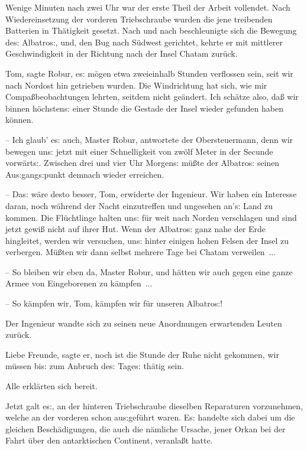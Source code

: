 \documentclass[oneside,12pt]{book}
\newcommand{\s}{s:}
\begin{document}
Wenige Minuten nach zwei Uhr war der erste Theil der Arbeit
vollendet. Nach Wiedereinsetzung der vorderen Triebschraube wurden
die jene treibenden Batterien in Th\"atigkeit gesetzt. Nach und nach
beschleunigte sich die Bewegung de{\s} {\glqq}Albatro{\s}{\grqq},
und, den Bug nach S\"udwest gerichtet, kehrte er mit mittlerer
Geschwindigkeit in der Richtung nach der Insel Chatam zur\"uck.

{\glqq}Tom, sagte Robur, e{\s} m\"ogen etwa zweieinhalb Stunden
verflossen sein, seit wir nach Nordost hin getrieben wurden. Die
Windrichtung hat sich, wie mir Compa{\ss}beobachtungen lehrten,
seitdem nicht ge\"andert. Ich sch\"atze also, da{\ss} wir binnen
h\"ochsten{\s} einer Stunde die Gestade der Insel wieder gefunden
haben k\"onnen.

-- Ich glaub' e{\s} auch, Master Robur, antwortete der
Obersteuermann, denn wir bewegen un{\s} jetzt mit einer Schnelligkeit
von zw\"olf Meter in der Secunde vorw\"art{\s}. Zwischen drei und
vier Uhr Morgen{\s} m\"u{\ss}te der {\glqq}Albatro{\s}{\grqq} seinen
Au{\s}gang{\s}punkt demnach wieder erreichen.

-- Da{\s} w\"are desto besser, Tom, erwiderte der Ingenieur. Wir
haben ein Interesse daran, noch w\"ahrend der Nacht einzutreffen und
ungesehen an'{\s} Land zu kommen. Die Fl\"uchtlinge halten un{\s}
f\"ur weit nach Norden verschlagen und sind jetzt gewi{\ss} nicht auf
ihrer Hut. Wenn der {\glqq}Albatro{\s}{\grqq} ganz nahe der Erde
hingleitet, werden wir versuchen, un{\s} hinter einigen hohen Felsen
der Insel zu verbergen. M\"u{\ss}ten wir dann selbst mehrere Tage bei
Chatam verweilen~...

-- So bleiben wir eben da, Master Robur, und h\"atten wir auch gegen
eine ganze Armee von Eingeborenen zu k\"ampfen~...

-- So k\"ampfen wir, Tom, k\"ampfen wir f\"ur unseren
{\glqq}Albatro{\s}{\grqq}!{\grqq}

Der Ingenieur wandte sich zu seinen neue Anordnungen erwartenden
Leuten zur\"uck.

{\glqq}Liebe Freunde, sagte er, noch ist die Stunde der Ruhe nicht
gekommen, wir m\"ussen bi{\s} zum Anbruch de{\s} Tage{\s} th\"atig
sein.{\grqq}

Alle erkl\"arten sich bereit.

Jetzt galt e{\s}, an der hinteren Triebschraube dieselben Reparaturen
vorzunehmen, welche an der vorderen schon au{\s}gef\"uhrt waren.
E{\s} handelte sich dabei um die gleichen Besch\"adigungen, die auch
die n\"amliche Ursache, jener Orkan bei der Fahrt \"uber den
antarktischen Continent, veranla{\ss}t hatte.
\end{document}
